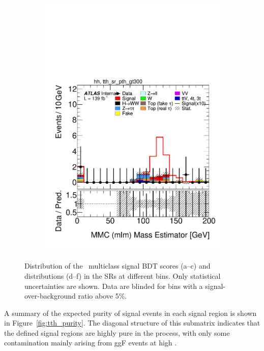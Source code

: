 \begin{figure}[h]
\begin{subfigure}[b]{0.32\textwidth}
    \includegraphics[width=\textwidth]{images/sr_cr_plots/plot_ditau_mmc_mlm_m_hh_tth_sr_pth_gt300.pdf}
    \caption{}
  \end{subfigure}

  \caption{Distribution of the \ttH\ multiclass signal BDT scores (a–c) and \mmc distributions 
  (d–f) in the SRs at different \pth bins. Only statistical uncertainties are shown. Data are blinded for 
  bins with a signal-over-background ratio above 5\%.
  }
  \label{fig:bdt_signal}
\end{figure}


A summary of the expected purity of \ttHtt signal events in each signal region is shown in Figure~\ref{fig:tth_purity}. The diagonal structure of this submatrix indicates that the defined signal regions are highly pure in the \ttH process, with only some contamination mainly arising from ggF events at high \pth.

